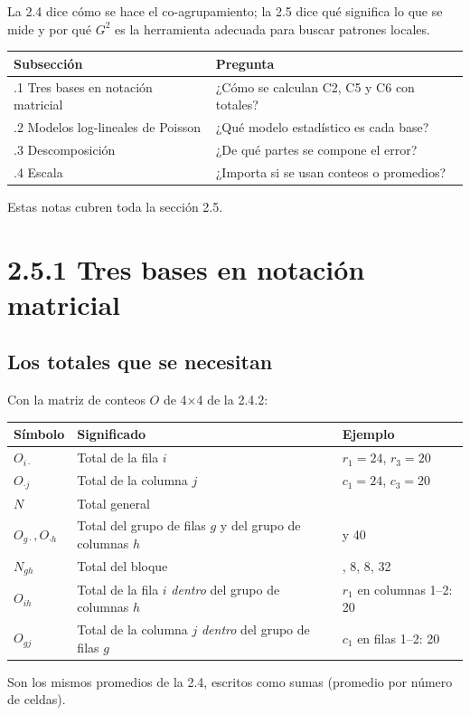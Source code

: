 \documentclass[11pt,a4paper]{article}
\newenvironment{idea}{\par\begin{center}\begin{lrbox}{\ideabox}\begin{minipage}{0.9\linewidth}}{\end{minipage}\end{lrbox}\fcolorbox{blue!40!black}{blue!5}{\usebox{\ideabox}}\end{center}}
\begin{document}
\begin{idea}
La 2.4 dice cómo se hace el co-agrupamiento; la 2.5 dice qué significa lo que se
mide y por qué $G^2$ es la herramienta adecuada para buscar patrones locales.
\end{idea}

\begin{center}
\renewcommand{\arraystretch}{1.3}
\begin{tabular}{@{}>{\raggedright\arraybackslash}p{5.4cm}>{\raggedright\arraybackslash}p{8.4cm}@{}}
\toprule
\textbf{Subsección} & \textbf{Pregunta} \\
\midrule
2.5.1 Tres bases en notación matricial & ¿Cómo se calculan C2, C5 y C6 con totales? \\
\midrule
2.5.2 Modelos log-lineales de Poisson & ¿Qué modelo estadístico es cada base? \\
\midrule
2.5.3 Descomposición & ¿De qué partes se compone el error? \\
\midrule
2.5.4 Escala & ¿Importa si se usan conteos o promedios? \\
\bottomrule
\end{tabular}
\end{center}
Estas notas cubren toda la sección 2.5.

\section{2.5.1 Tres bases en notación matricial}

\subsection{Los totales que se necesitan}

Con la matriz de conteos $O$ de 4$\times$4 de la 2.4.2:
\begin{center}
\renewcommand{\arraystretch}{1.3}
\begin{tabular}{@{}>{\raggedright\arraybackslash}p{2.8cm}>{\raggedright\arraybackslash}p{7.0cm}>{\raggedright\arraybackslash}p{3.8cm}@{}}
\toprule
\textbf{Símbolo} & \textbf{Significado} & \textbf{Ejemplo} \\
\midrule
$O_{i\cdot}$ & Total de la fila $i$ & $r_1=24$, $r_3=20$ \\
\midrule
$O_{\cdot j}$ & Total de la columna $j$ & $c_1=24$, $c_3=20$ \\
\midrule
$N$ & Total general & 88 \\
\midrule
$O_{g\cdot},O_{\cdot h}$ & Total del grupo de filas $g$ y del grupo de columnas $h$ & 48 y 40 \\
\midrule
$N_{gh}$ & Total del bloque & 40, 8, 8, 32 \\
\midrule
$O_{ih}$ & Total de la fila $i$ \emph{dentro} del grupo de columnas $h$ & $r_1$ en columnas 1--2: 20 \\
\midrule
$O_{gj}$ & Total de la columna $j$ \emph{dentro} del grupo de filas $g$ & $c_1$ en filas 1--2: 20 \\
\bottomrule
\end{tabular}
\end{center}
Son los mismos promedios de la 2.4, escritos como sumas (promedio por número de
celdas).
\end{document}
